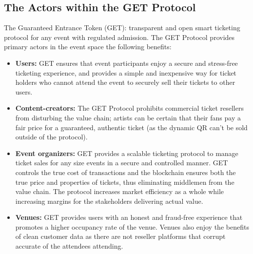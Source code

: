 \documentclass[letterpaper,10pt]{article}
\begin{document}
\newpage
\subsection*{The Actors within the GET Protocol}
The Guaranteed Entrance Token (GET): transparent and open smart ticketing protocol for any event with regulated admission. The GET Protocol provides primary actors in the event space the following benefits:
    \begin{itemize}
        \item \textbf{Users:} GET ensures that event participants enjoy a secure and stress-free ticketing experience, and provides a simple and inexpensive way for ticket holders who cannot attend the event to securely sell their tickets to other users.
        \item \textbf{Content-creators:} The GET Protocol prohibits commercial ticket resellers from disturbing the value chain; artists can be certain that their fans pay a fair price for a guaranteed, authentic ticket (as the dynamic QR can't be sold outside of the protocol).
        \item \textbf{Event organizers:} GET provides a scalable ticketing protocol to manage ticket sales for any size events in a secure and controlled manner. GET controls the true cost of transactions and the blockchain ensures both the true price and properties of tickets, thus eliminating middlemen from the value chain. The protocol increases market efficiency as a whole while increasing margins for the stakeholders delivering actual value. 
        \item \textbf{Venues:} GET provides users with an honest and fraud-free experience that promotes a higher occupancy rate of the venue. Venues also enjoy the benefits of clean customer data as there are not reseller platforms that corrupt accurate of the attendees attending.  
    \end{itemize}
\end{document}
